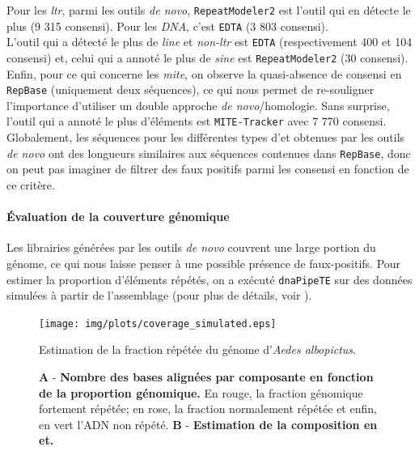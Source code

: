 \documentclass[10pt]{article}
\begin{document}
Pour les \textit{\acrshort{ltr}}, parmi les outils \textit{de novo}, \texttt{RepeatModeler2} est l'outil qui en détecte le plus (9 315 consensi). Pour les \textit{DNA}, c'est \texttt{EDTA} (3 803 consensi). \\
L'outil qui a détecté le plus de \textit{\acrshort{line}} et \textit{non-\acrshort{ltr}} est \texttt{EDTA} (respectivement 400 et 104 consensi) et, celui qui a annoté le plus de \textit{\acrshort{sine}} est \texttt{RepeatModeler2} (30 consensi). \\
Enfin, pour ce qui concerne les \textit{\acrshort{mite}}, on observe la quasi-absence de consensi en \texttt{RepBase} (uniquement deux séquences), ce qui nous permet de re-souligner l'importance d'utiliser un double approche \textit{de novo}/homologie. Sans surprise, l'outil qui a annoté le plus d'éléments est \texttt{MITE-Tracker} avec 7 770 consensi. \\

Globalement, les séquences pour les différentes types d'\acrshort{et} obtenues par les outils \textit{de novo} ont des longueurs similaires aux séquences contenues dans \texttt{RepBase}, donc on peut pas imaginer de filtrer des faux positifs parmi les consensi en fonction de ce critère. \\

\bigskip

\paragraph{\'Evaluation de la couverture génomique}\label{par:coverage}

Les librairies générées par les outils \textit{de novo} couvrent une large portion du génome, ce qui nous laisse penser à une possible présence de faux-positifs. Pour estimer la proportion d'éléments répétés, on a exécuté \texttt{dnaPipeTE} \cite{goubert_novo_2015} sur des données simulées à partir de l'assemblage (pour plus de détails, voir ). \\

\bigskip

\begin{figure}[h]
    \centering
    \texttt{[image: img/plots/coverage\_simulated.eps]}
    \caption{Estimation de la fraction répétée du génome d'\textit{Aedes albopictus}.}
    \caption*{\scriptsize
    \textbf{A} - \textbf{Nombre des bases alignées par composante en fonction de la proportion génomique.} En rouge, la fraction génomique fortement répétée; en rose, la fraction normalement répétée et enfin, en vert l'ADN non répété. \textbf{B} - \textbf{Estimation de la composition en \acrlong{et}.}
    }
    \label{fig:coverage_simulated}
\end{figure}
\end{document}
